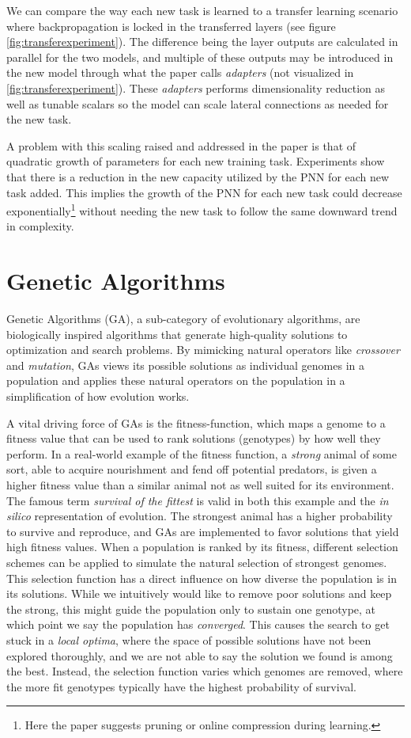 We can compare the way each new task is learned to a transfer learning scenario where backpropagation is locked in the transferred layers (see figure \ref{fig:transferexperiment}). The difference being the layer outputs are calculated in parallel for the two models, and multiple of these outputs may be introduced in the new model through what the paper calls \textit{adapters} (not visualized in \ref{fig:transferexperiment}). These \textit{adapters} performs dimensionality reduction as well as tunable scalars so the model can scale lateral connections as needed for the new task.

A problem with this scaling raised and addressed in the paper is that of quadratic growth of parameters for each new training task. Experiments show that there is a reduction in the new capacity utilized by the PNN for each new task added. This implies the growth of the PNN for each new task could decrease exponentially\footnote{Here the paper suggests pruning or online compression during learning.} without needing the new task to follow the same downward trend in complexity. 

\section{Genetic Algorithms}
\label{background:GA}
Genetic Algorithms\cite{GAbook} (GA), a sub-category of evolutionary algorithms,  are biologically inspired algorithms that generate high-quality solutions to optimization and search problems. By mimicking natural operators like \textit{crossover} and \textit{mutation}, GAs views its possible solutions as individual genomes in a population and applies these natural operators on the population in a simplification of how evolution works. 

A vital driving force of GAs is the fitness-function, which maps a genome to a fitness value that can be used to rank solutions (genotypes) by how well they perform. In a real-world example of the fitness function, a \textit{strong} animal of some sort, able to acquire nourishment and fend off potential predators, is given a higher fitness value than a similar animal not as well suited for its environment. The famous term \textit{survival of the fittest} is valid in both this example and the \textit{in silico} representation of evolution. The strongest animal has a higher probability to survive and reproduce, and GAs are implemented to favor solutions that yield high fitness values.  
When a population is ranked by its fitness, different selection schemes can be applied to simulate the natural selection of strongest genomes. This selection function has a direct influence on how diverse the population is in its solutions. While we intuitively would like to remove poor solutions and keep the strong, this might guide the population only to sustain one genotype, at which point we say the population has \textit{converged}. This causes the search to get stuck in a \textit{local optima}, where the space of possible solutions have not been explored thoroughly, and we are not able to say the solution we found is among the best. Instead, the selection function varies which genomes are removed, where the more fit genotypes typically have the highest probability of survival. 

